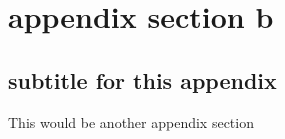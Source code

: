 \section{appendix section b}
\subsection*{subtitle for this appendix}
This would be another appendix section